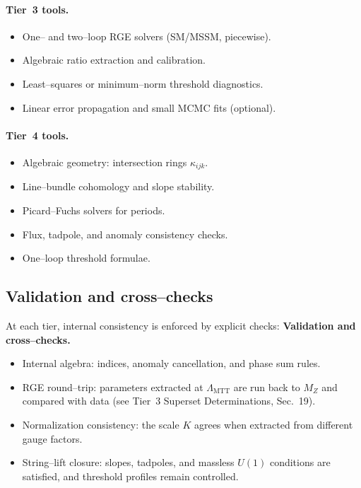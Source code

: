 \documentclass[11pt]{article}
\begin{document}
\paragraph{Tier~3 tools.}
\begin{itemize}
  \item One-- and two--loop RGE solvers (SM/MSSM, piecewise).
  \item Algebraic ratio extraction and calibration.
  \item Least--squares or minimum--norm threshold diagnostics.
  \item Linear error propagation and small MCMC fits (optional).
\end{itemize}

\paragraph{Tier~4 tools.}
\begin{itemize}
  \item Algebraic geometry: intersection rings $\kappa_{ijk}$.
  \item Line--bundle cohomology and slope stability.
  \item Picard--Fuchs solvers for periods.
  \item Flux, tadpole, and anomaly consistency checks.
  \item One--loop threshold formulae.
\end{itemize}

\subsection{Validation and cross--checks}

At each tier, internal consistency is enforced by explicit checks:
\noindent\textbf{Validation and cross--checks.}
\begin{itemize}
  \item Internal algebra:
        indices, anomaly cancellation, and phase sum rules.
  \item RGE round--trip:
        parameters extracted at $\Lambda_{\mathrm{MTT}}$ are run back
        to $M_Z$ and compared with data
        (see Tier~3 Superset Determinations, Sec.~19).
  \item Normalization consistency:
        the scale $K$ agrees when extracted from different gauge factors.
  \item String--lift closure:
        slopes, tadpoles, and massless $U(1)$ conditions are satisfied,
        and threshold profiles remain controlled.
\end{itemize}
\end{document}
